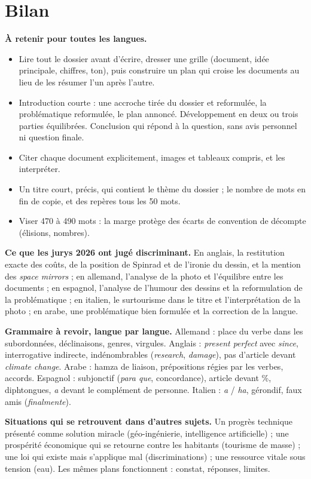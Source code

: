 \documentclass[11pt,a4paper]{article}
\providecommand{\tightlist}{\setlength{\itemsep}{0pt}\setlength{\parskip}{0pt}}
\begin{document}
\hypertarget{bilan}{%
\section{Bilan}\label{bilan}}

\textbf{À retenir pour toutes les langues.}

\begin{itemize}
\tightlist
\item
  Lire tout le dossier avant d'écrire, dresser une grille (document, idée principale, chiffres, ton), puis construire un plan qui croise les documents au lieu de les résumer l'un après l'autre.
\item
  Introduction courte : une accroche tirée du dossier et reformulée, la problématique reformulée, le plan annoncé. Développement en deux ou trois parties équilibrées. Conclusion qui répond à la question, sans avis personnel ni question finale.
\item
  Citer chaque document explicitement, images et tableaux compris, et les interpréter.
\item
  Un titre court, précis, qui contient le thème du dossier ; le nombre de mots en fin de copie, et des repères tous les 50 mots.
\item
  Viser 470 à 490 mots : la marge protège des écarts de convention de décompte (élisions, nombres).
\end{itemize}

\textbf{Ce que les jurys 2026 ont jugé discriminant.} En anglais, la restitution exacte des coûts, de la position de Spinrad et de l'ironie du dessin, et la mention des \emph{space mirrors} ; en allemand, l'analyse de la photo et l'équilibre entre les documents ; en espagnol, l'analyse de l'humour des dessins et la reformulation de la problématique ; en italien, le surtourisme dans le titre et l'interprétation de la photo ; en arabe, une problématique bien formulée et la correction de la langue.

\textbf{Grammaire à revoir, langue par langue.} Allemand : place du verbe dans les subordonnées, déclinaisons, genres, virgules. Anglais : \emph{present perfect} avec \emph{since}, interrogative indirecte, indénombrables (\emph{research}, \emph{damage}), pas d'article devant \emph{climate change}. Arabe : hamza de liaison, prépositions régies par les verbes, accords. Espagnol : subjonctif (\emph{para que}, concordance), article devant \%, diphtongues, \emph{a} devant le complément de personne. Italien : \emph{a} / \emph{ha}, gérondif, faux amis (\emph{finalmente}).

\textbf{Situations qui se retrouvent dans d'autres sujets.} Un progrès technique présenté comme solution miracle (géo-ingénierie, intelligence artificielle) ; une prospérité économique qui se retourne contre les habitants (tourisme de masse) ; une loi qui existe mais s'applique mal (discriminations) ; une ressource vitale sous tension (eau). Les mêmes plans fonctionnent : constat, réponses, limites.
\end{document}

